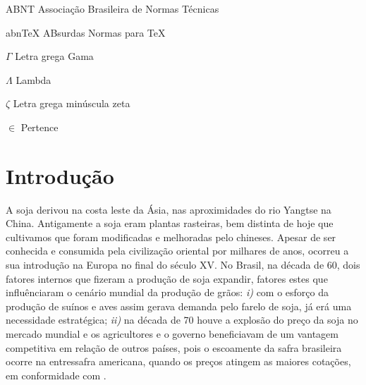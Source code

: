 \documentclass[
	12pt,				%
	openright,			%
	oneside,      %
	a4paper,			%
	english,			%
	french,				%
	spanish,			%
	brazil,				%
	]{abntex2}\usepackage[]{graphicx}\usepackage[]{xcolor}
\begin{document}
\listoffigures*
\cleardoublepage

\listoftables*
\cleardoublepage

\begin{siglas}
  \item[ABNT] Associação Brasileira de Normas Técnicas
  \item[abnTeX] ABsurdas Normas para TeX
\end{siglas}

\begin{simbolos}
  \item[$ \Gamma $] Letra grega Gama
  \item[$ \Lambda $] Lambda
  \item[$ \zeta $] Letra grega minúscula zeta
  \item[$ \in $] Pertence
\end{simbolos}

\tableofcontents*
\cleardoublepage

\textual

\chapter[Introdução]{Introdução}

A soja derivou na costa leste da Ásia, nas aproximidades do rio Yangtse na China. Antigamente a soja eram plantas rasteiras, bem distinta de hoje que cultivamos que foram modificadas e melhoradas pelo chineses. Apesar de ser conhecida e consumida pela civilização oriental por milhares de anos, ocorreu a sua introdução na Europa no final do século XV. No Brasil, na década de 60, dois fatores internos que fizeram a produção de 
soja expandir, fatores estes que influênciaram o cenário mundial da produção de grãos: \textit{i)} com o esforço da produção de suínos e aves assim gerava demanda pelo farelo de soja, já erá uma necessidade estratégica; \textit{ii)} na década de 70 houve a explosão 
do preço da soja no mercado mundial e os agricultores e o governo beneficiavam de um 
vantagem competitiva em relação de outros países, pois o escoamente da safra brasileira ocorre na entressafra americana, quando os preços atingem as maiores cotações, em conformidade com \cite{embrapa2022}.
\end{document}
